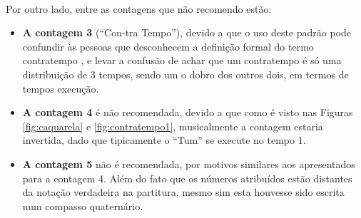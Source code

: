 ~\\

Por outro lado, entre as contagens que não recomendo estão:
\begin{itemize}
\item \textbf{A contagem 3} (``Con-tra Tempo''), 
devido a que o uso deste padrão pode confundir às pessoas que desconhecem 
a definição formal do termo contratempo \cite[pp. 16]{mascarenhascurso} \cite[pp. 36]{azevedocompor}, 
e levar a confusão de achar que um contratempo é só uma distribuição de 3 tempos, 
sendo um o dobro dos outros dois, em termos de tempos execução.
\item \textbf{A contagem 4} é não recomendada, devido a que como é visto nas Figuras 
\ref{fig:caquarela} e \ref{fig:contratempo1}, musicalmente a contagem estaria invertida,
dado que tipicamente o ``Tum'' se execute no tempo 1.

\item \textbf{A contagem 5} não é recomendada, 
por motivos similares aos apresentados para a contagem 4. 
Além do fato que os números atribuídos estão distantes da
notação verdadeira na partitura, mesmo sim esta houvesse sido escrita num compasso quaternário.
\end{itemize}


